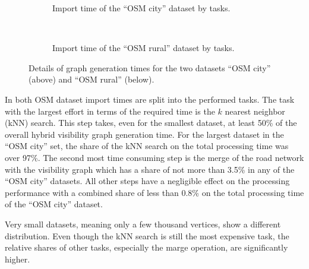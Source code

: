			\begin{figure}[h!]
				\begin{figcenter}
					\begin{subfigure}[t]{\textwidth}
						\begin{figcenter}
							
						\end{figcenter}
						\caption{Import time of the \enquote{OSM city} dataset by tasks.}
					\end{subfigure}
					\\[3ex]
					\begin{subfigure}[t]{\textwidth}
						\begin{figcenter}
							
						\end{figcenter}
						\caption{Import time of the \enquote{OSM rural} dataset by tasks.}
					\end{subfigure}
				\end{figcenter}
				\caption{Details of graph generation times for the two datasets \enquote{OSM city} (above) and \enquote{OSM rural} (below).}
				\label{fig:eval-import-details}
			\end{figure}
			
			In  both OSM dataset import times are split into the performed tasks.
			The task with the largest effort in terms of the required time is the $k$ nearest neighbor (kNN) search.
			This step takes, even for the smallest dataset, at least 50\% of the overall hybrid visibility graph generation time.
			For the largest dataset in the \enquote{OSM city} set, the share of the kNN search on the total processing time was over 97\%.
			The second most time consuming step is the merge of the road network with the visibility graph which has a share of not more than 3.5\% in any of the \enquote{OSM city} datasets.
			All other steps have a negligible effect on the processing performance with a combined share of less than 0.8\% on the total processing time of the \enquote{OSM city} dataset.
			
			Very small datasets, meaning only a few thousand vertices, show a different distribution.
			Even though the kNN search is still the most expensive task, the relative shares of other tasks, especially the marge operation, are significantly higher.
			
	
